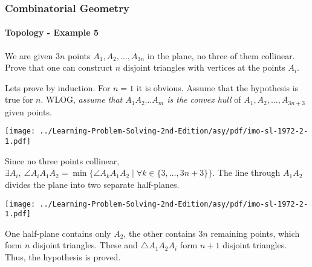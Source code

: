 \documentclass[8pt,xcolor=table,dvipsnames]{beamer}
\begin{document}
\begin{frame}[t]
    \frametitle{Combinatorial Geometry}
    \framesubtitle{Topology - Example 5}
    \begin{example}[IMO SL 1972/2]
        We are given $3n$ points $A_1,A_2, \ldots , A_{3n}$ in the plane, no three of them collinear.
        Prove that one can construct $n$ disjoint triangles with vertices at the points $A_i.$
    \end{example}
    \begin{overprint}
        Lets prove by induction. For $n=1$ it is obvious. Assume that the hypothesis is true for $n$. 
        WLOG, \textit{assume that $A_1A_2\ldots A_m$ is the convex hull} of $A_1,A_2, \ldots, A_{3n+3}$ given points.
        \begin{center}
            \texttt{[image: ../Learning-Problem-Solving-2nd-Edition/asy/pdf/imo-sl-1972-2-1.pdf]}
        \end{center}
        Since no three points collinear,
        $\exists A_i,\ \angle A_iA_1A_2 = \min \{ \angle A_kA_1A_2 \mid \forall k \in \{ 3,\ldots, 3n+3 \} \}.$
        The line through $A_1A_2$ divides the plane into two separate half-planes.
        \begin{center}
            \texttt{[image: ../Learning-Problem-Solving-2nd-Edition/asy/pdf/imo-sl-1972-2-1.pdf]}
        \end{center}
        One half-plane contains only $A_2$, the other contains $3n$ remaining points,
        which form $n$ disjoint triangles. These and $\triangle A_1A_2A_i$ form $n+1$ disjoint triangles.
        Thus, the hypothesis is proved.
    \end{overprint}
\end{frame}
\end{document}
